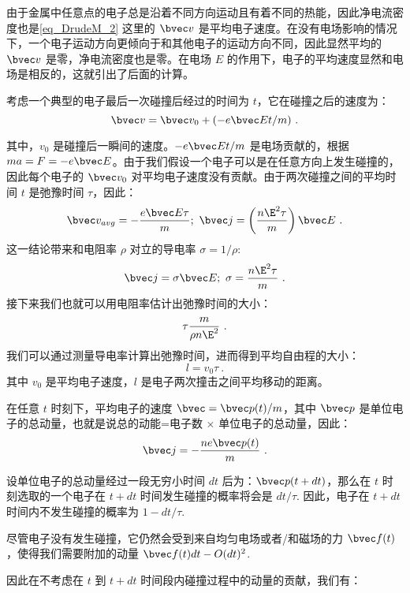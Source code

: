 由于金属中任意点的电子总是沿着不同方向运动且有着不同的热能，因此净电流密度也是\autoref{eq_DrudeM_2} 这里的 $\bvec v$ 是平均电子速度。在没有电场影响的情况下，一个电子运动方向更倾向于和其他电子的运动方向不同，因此显然平均的 $\bvec v$ 是零，净电流密度也是零。在电场 $E$ 的作用下，电子的平均速度显然和电场是相反的，这就引出了后面的计算。

考虑一个典型的电子最后一次碰撞后经过的时间为 $t$，它在碰撞之后的速度为：
\begin{equation}
\bvec v = \bvec v_0 + (-e\bvec E t/m)~.
\end{equation}

其中，$v_0$ 是碰撞后一瞬间的速度。$-e\bvec E t/m$ 是电场贡献的，根据 $ma = F = -e\bvec E$。由于我们假设一个电子可以是在任意方向上发生碰撞的，因此每个电子的 $\bvec v_0$ 对平均电子速度没有贡献。由于两次碰撞之间的平均时间 $t$ 是弛豫时间 $\tau$，因此：
\begin{equation}
\bvec v_{avg} = -\frac{e\bvec E \tau}{m}; \ \bvec j =\left(\frac{n\E^2\tau}{m}\right)\bvec E~.
\end{equation}
这一结论带来和电阻率 $\rho$ 对立的导电率 $\sigma = 1/\rho$:
\begin{equation}\label{eq_DrudeM_4}
\bvec j = \sigma \bvec E; \ \sigma = \frac{n\E^2\tau}{m}~.
\end{equation}
接下来我们也就可以用电阻率估计出弛豫时间的大小：
\begin{equation}
\tau \frac{m}{\rho n \E^2}~.
\end{equation}
我们可以通过测量导电率计算出弛豫时间，进而得到平均自由程的大小：
\begin{equation}
l=v_0\tau~.
\end{equation}
其中 $v_0$ 是平均电子速度，$l$ 是电子两次撞击之间平均移动的距离。

在任意 $t$ 时刻下，平均电子的速度 $\bvec=\bvec p(t)/m$，其中 $\bvec p$ 是单位电子的总动量，也就是说总的动能=电子数 $\times$ 单位电子的总动量，因此：
\begin{equation}
\bvec j= -\frac{ne\bvec p(t)}{m}~.
\end{equation}

设单位电子的总动量经过一段无穷小时间 $dt$ 后为：$\bvec p (t+dt)$，那么在 $t$ 时刻选取的一个电子在 $t+dt$ 时间发生碰撞的概率将会是 $dt/\tau$. 因此，电子在 $t+dt$ 时间内不发生碰撞的概率为 $1-dt/\tau$.

尽管电子没有发生碰撞，它仍然会受到来自均匀电场或者/和磁场的力 $\bvec f(t)$，使得我们需要附加的动量 $\bvec f(t)dt - O(dt)^2$.

因此在不考虑在 $t$ 到 $t+dt$ 时间段内碰撞过程中的动量的贡献，我们有：

